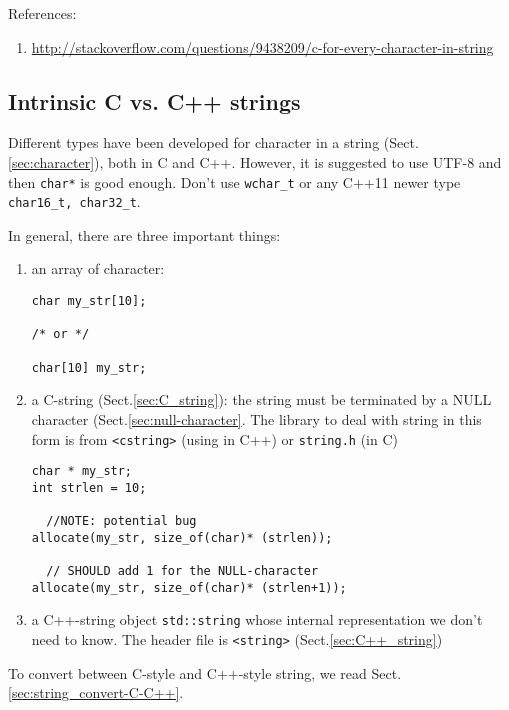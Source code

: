 References:
\begin{enumerate}
  \item
  \url{http://stackoverflow.com/questions/9438209/c-for-every-character-in-string}
\end{enumerate}


\subsection{Intrinsic C vs. C++ strings}

Different types have been developed for character in a string
(Sect.\ref{sec:character}), both in C and C++. However, it is suggested to use
UTF-8 and then \verb!char*! is good enough. Don't use \verb!wchar_t! or any
C++11 newer type \verb!char16_t, char32_t!.

In general, there are three important things:
\begin{enumerate}
  \item an array of character:
\begin{Verbatim}
char my_str[10];

/* or */

char[10] my_str; 
\end{Verbatim}

   \item a C-string (Sect.\ref{sec:C_string}): the string must be terminated by
   a NULL character (Sect.\ref{sec:null-character}. The library to deal with
   string in this form is from \verb!<cstring>! (using in C++) or
   \verb!string.h! (in C)
\begin{Verbatim}
char * my_str;
int strlen = 10;
 
  //NOTE: potential bug
allocate(my_str, size_of(char)* (strlen));

  // SHOULD add 1 for the NULL-character
allocate(my_str, size_of(char)* (strlen+1));
\end{Verbatim}

   \item a C++-string object \verb!std::string! whose internal representation we
   don't need to know. The header file is \verb!<string>!
   (Sect.\ref{sec:C++_string})
\end{enumerate}
To convert between C-style and C++-style string, we read
Sect.\ref{sec:string_convert-C-C++}. 


